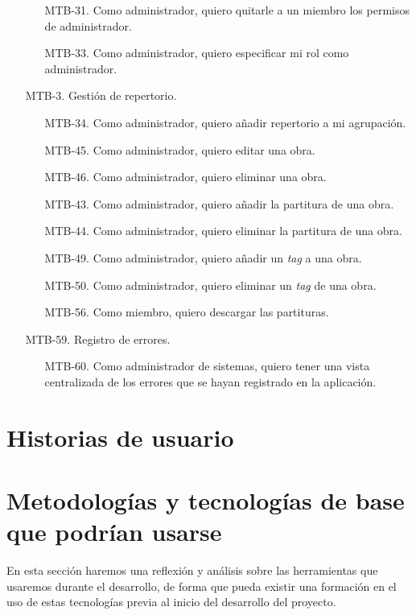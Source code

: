 \begin{enumerate}
\begin{enumerate}
            \item[MTB-31.] Como administrador, quiero quitarle a un miembro los permisos de administrador.
            \item[MTB-33.] Como administrador, quiero especificar mi rol como administrador.
        \end{enumerate}
    \item[MTB-3.] Gestión de repertorio.
        \begin{enumerate}
            \item[MTB-34.] Como administrador, quiero añadir repertorio a mi agrupación.
            \item[MTB-45.] Como administrador, quiero editar una obra.
            \item[MTB-46.] Como administrador, quiero eliminar una obra.
            \item[MTB-43.] Como administrador, quiero añadir la partitura de una obra.
            \item[MTB-44.] Como administrador, quiero eliminar la partitura de una obra.
            \item[MTB-49.] Como administrador, quiero añadir un \textit{tag} a una obra.
            \item[MTB-50.] Como administrador, quiero eliminar un \textit{tag} de una obra.
            \item[MTB-56.] Como miembro, quiero descargar las partituras.
        \end{enumerate}
    \item[MTB-59.] Registro de errores.
        \begin{enumerate}
            \item[MTB-60.] Como administrador de sistemas, quiero tener una vista centralizada de los errores que se hayan registrado en la aplicación.
        \end{enumerate}
\end{enumerate}


\section{Historias de usuario}

\section{Metodologías y tecnologías de base que podrían usarse}\label{section:metodologias}

En esta sección haremos una reflexión y análisis sobre las herramientas que usaremos durante el desarrollo, de forma que pueda existir una formación en el uso de estas tecnologías previa al inicio del desarrollo del proyecto.

